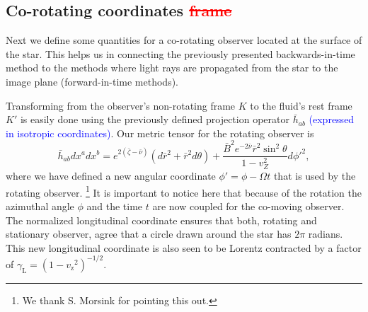 \documentclass{aa}
\newcommand{\be}{\begin{equation}}
\newcommand{\ee}{\end{equation}}
\newcommand{\refe}[1]{\textcolor{blue}{{#1}}}
\newcommand{\refedel}[1]{\textcolor{red}{\sout{#1}}}
\newcommand{\rb}{\ensuremath{\bar{r}}}
\newcommand{\nub}{\ensuremath{\bar{\nu}}}
\newcommand{\zetab}{\ensuremath{\bar{\zeta}}}
\newcommand{\Bb}{\ensuremath{\bar{B}}}
\newcommand{\vz}{\ensuremath{v_{\mathrm{z}}}}
\newcommand{\lgamma}{\gamma_{\text{L}}}
\begin{document}
\subsection{Co-rotating coordinates \refedel{frame}}\label{sect:coords}
Next we define some quantities for a co-rotating observer located at the surface of the star.
This helps us in connecting the previously presented backwards-in-time method to the methods where light rays are propagated from the star to the image plane (forward-in-time methods).

Transforming from the observer's non-rotating frame $K$ to the fluid's rest frame $K'$ is easily done using the previously defined projection operator $\bar{h}_{ab}$ \refe{(expressed in isotropic coordinates)}. 
Our metric tensor for the rotating observer is 
\be
\bar{h}_{ab} dx^a dx^b = e^{2(\zetab - \nub)} (d\rb^2 + \rb^2 d\theta) + \frac{\Bb^2 e^{-2\nub} \rb^2 \sin^2\theta}{1-v_Z^2} d{\phi'}^{2},
\ee
where we have defined a new angular coordinate $\phi' = \phi - \Omega t$ that is used by the rotating observer.%
\footnote{We thank S. Morsink for pointing this out.}
It is important to notice here that because of the rotation the azimuthal angle $\phi$ and the time $t$ are now coupled for the co-moving observer.
The normalized longitudinal coordinate ensures that both, rotating and stationary observer, agree that a circle drawn around the star has $2\pi$ radians.
This new longitudinal coordinate is also seen to be Lorentz contracted by a factor of $\lgamma = (1-\vz^2)^{-1/2}$.
\end{document}
